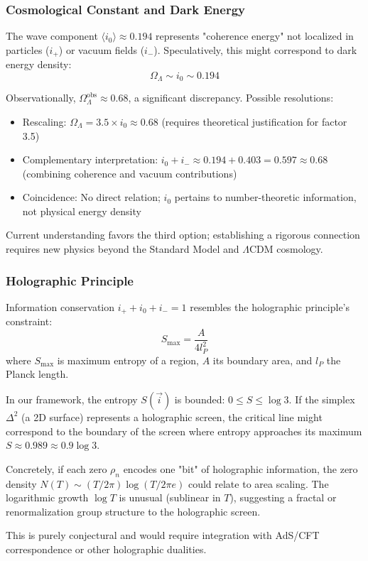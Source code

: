 \documentclass[12pt]{article}
\theoremstyle{plain}
\theoremstyle{definition}
\begin{document}
\subsubsection{Cosmological Constant and Dark Energy}

\begin{speculation}
The wave component $\langle i_0 \rangle \approx 0.194$ represents "coherence energy" not localized in particles ($i_+$) or vacuum fields ($i_-$). Speculatively, this might correspond to dark energy density:
$$\Omega_{\Lambda} \sim i_0 \sim 0.194$$

Observationally, $\Omega_{\Lambda}^{\text{obs}} \approx 0.68$, a significant discrepancy. Possible resolutions:
\begin{itemize}
\item Rescaling: $\Omega_{\Lambda} = 3.5 \times i_0 \approx 0.68$ (requires theoretical justification for factor 3.5)
\item Complementary interpretation: $i_0 + i_- \approx 0.194 + 0.403 = 0.597 \approx 0.68$ (combining coherence and vacuum contributions)
\item Coincidence: No direct relation; $i_0$ pertains to number-theoretic information, not physical energy density
\end{itemize}

Current understanding favors the third option; establishing a rigorous connection requires new physics beyond the Standard Model and $\Lambda$CDM cosmology.
\end{speculation}

\subsubsection{Holographic Principle}

\begin{speculation}
Information conservation $i_+ + i_0 + i_- = 1$ resembles the holographic principle's constraint:
$$S_{\max} = \frac{A}{4 l_P^2}$$
where $S_{\max}$ is maximum entropy of a region, $A$ its boundary area, and $l_P$ the Planck length.

In our framework, the entropy $S(\vec{i})$ is bounded: $0 \leq S \leq \log 3$. If the simplex $\Delta^2$ (a 2D surface) represents a holographic screen, the critical line might correspond to the boundary of the screen where entropy approaches its maximum $S \approx 0.989 \approx 0.9 \log 3$.

Concretely, if each zero $\rho_n$ encodes one "bit" of holographic information, the zero density $N(T) \sim (T/2\pi) \log(T/2\pi e)$ could relate to area scaling. The logarithmic growth $\log T$ is unusual (sublinear in $T$), suggesting a fractal or renormalization group structure to the holographic screen.

This is purely conjectural and would require integration with AdS/CFT correspondence or other holographic dualities.
\end{speculation}
\end{document}
